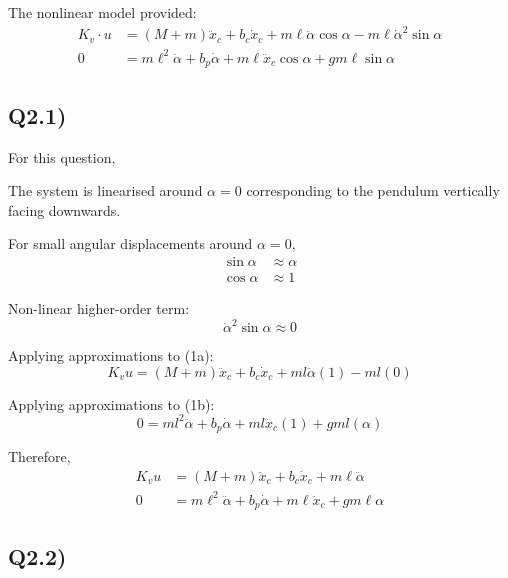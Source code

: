 \documentclass[11pt,a4paper]{article}
\begin{document}
The nonlinear model provided:
\begin{align}
	K_{v} \cdot u &= \left( M + m \right) \ddot{x}_{c} + b_{c} \dot{x}_{c}
	+ m \ell \ddot{\alpha} \cos\alpha
	- m \ell \dot{\alpha}^{2} \sin\alpha \tag{1a} \\
	0 &= m \ell^{2} \ddot{\alpha} + b_{p} \dot{\alpha}
	+ m \ell \ddot{x}_{c} \cos\alpha + g m \ell \sin\alpha \tag{1b}
\end{align}

\subsection*{Q2.1)}

For this question,

The system is linearised around $\alpha = 0$ corresponding to the pendulum
vertically facing downwards.

For small angular displacements around $\alpha = 0$,
\begin{align*}
	\sin\alpha &\approx \alpha \\
	\cos\alpha &\approx 1
\end{align*}

Non-linear higher-order term:
\begin{equation*}
	\dot{\alpha}^{2} \sin\alpha \approx 0
\end{equation*}

Applying approximations to (1a):
\begin{equation*}
	K_{v} u = \left( M + m \right) \ddot{x}_{c} + b_{c} \dot{x}_{c}
	+ m l \ddot{\alpha}(1) - m l (0)
\end{equation*}

Applying approximations to (1b):
\begin{equation*}
	0 = m l^{2} \ddot{\alpha} + b_{p} \dot{\alpha}
	+ m l \ddot{x}_{c}(1) + g m l (\alpha)
\end{equation*}

Therefore,
\begin{align}
	K_{v} u &= \left( M + m \right) \ddot{x}_{c} + b_{c} \dot{x}_{c}
	+ m \ell \ddot{\alpha} \tag{2a} \\
	0 &= m \ell^{2} \ddot{\alpha} + b_{p} \dot{\alpha}
	+ m \ell \ddot{x}_{c} + g m \ell \alpha \tag{2b}
\end{align}

\subsection*{Q2.2)}
\end{document}

